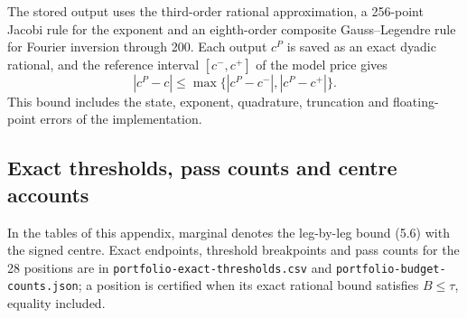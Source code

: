 \documentclass[11pt,a4paper]{article}
\newcommand{\code}[1]{\texttt{\small #1}}
\begin{document}
The stored output uses the third-order rational approximation, a 256-point Jacobi rule for the exponent and an eighth-order composite Gauss–Legendre rule for Fourier inversion through 200. Each output \(c^P\) is saved as an exact dyadic rational, and the reference interval \([c^-,c^+]\) of the model price gives
\begin{equation*}\tag{E.9}
|c^P-c|\le\max\{|c^P-c^-|,|c^P-c^+|\}.
\end{equation*}
This bound includes the state, exponent, quadrature, truncation and floating-point errors of the implementation.

\setcounter{subsection}{2}\subsection{Exact thresholds, pass counts and centre accounts}

In the tables of this appendix, marginal denotes the leg-by-leg bound (5.6) with the signed centre. Exact endpoints, threshold breakpoints and pass counts for the 28 positions are in \code{portfolio-\allowbreak{}exact-\allowbreak{}thresholds.\allowbreak{}csv} and \code{portfolio-\allowbreak{}budget-\allowbreak{}counts.\allowbreak{}json}; a position is certified when its exact rational bound satisfies \(B\le\tau\), equality included.
\end{document}
